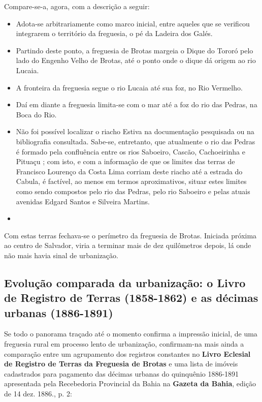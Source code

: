 Compare-se-a, agora, com a descrição a seguir:

\begin{itemize}
\item Adota-se arbitrariamente como marco inicial, entre aqueles que se verificou integrarem o território da freguesia, o pé da Ladeira dos Galés.
\item Partindo deste ponto, a freguesia de Brotas margeia o Dique do Tororó pelo lado do Engenho Velho de Brotas, até o ponto onde o dique dá origem ao rio Lucaia.
\item A fronteira da freguesia segue o rio Lucaia até sua foz, no Rio Vermelho.
\item Daí em diante a freguesia limita-se com o mar até a foz do rio das Pedras, na Boca do Rio.
\item Não foi possível localizar o riacho Estiva na documentação pesquisada ou na bibliografia consultada. Sabe-se, entretanto, que atualmente o rio das Pedras é formado pela confluência entre os rios Saboeiro, Cascão, Cachoeirinha e Pituaçu \cite[p.~175]{santos_aguas_2010}; com isto, e com a informação de que os limites das terras de Francisco Lourenço da Costa Lima corriam deste riacho até a estrada do Cabula, é factível, ao menos em termos aproximativos, situar estes limites como sendo compostos pelo rio das Pedras, pelo rio Saboeiro e pelas atuais avenidas Edgard Santos e Silveira Martins.
\item 
\end{itemize}



Com estas terras fechava-se o perímetro da freguesia de Brotas. Iniciada próxima ao centro de Salvador, viria a terminar mais de dez quilômetros depois, lá onde não mais havia sinal de urbanização.

\subsection{Evolução comparada da urbanização: o Livro de Registro de Terras (1858-1862) e as décimas urbanas (1886-1891)}

Se todo o panorama traçado até o momento confirma a impressão inicial, de uma freguesia rural em processo lento de urbanização, confirmam-na mais ainda a comparação entre um agrupamento dos registros constantes no \textbf{Livro Eclesial de Registro de Terras da Freguesia de Brotas} e uma lista de imóveis cadastrados para pagamento das décimas urbanas do quinquênio 1886-1891 apresentada pela Recebedoria Provincial da Bahia na \textbf{Gazeta da Bahia}, edição de 14 dez. 1886., p. 2:

